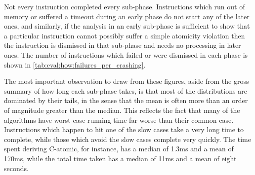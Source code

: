 Not every instruction completed every sub-phase.  Instructions which
run out of memory or suffered a timeout during an early phase do not
start any of the later ones, and similarly, if the analysis in an
early sub-phase is sufficient to show that a particular instruction
cannot possibly suffer a \gls{simple atomicity violation} then the
instruction is dismissed in that sub-phase and needs no processing in
later ones.  The number of instructions which failed or were dismissed
in each phase is shown in
\autoref{tab:eval:how:failures_per_crashing}.

The most important observation to draw from these figures, aside from
the gross summary of how long each sub-phase takes, is that most of
the distributions are dominated by their tails, in the sense that the
mean is often more than an order of magnitude greater than the median.
This reflects the fact that many of the algorithms have worst-case
running time far worse than their common case.  Instructions which
happen to hit one of the slow cases take a very long time to complete,
while those which avoid the slow cases complete very quickly.  The
time spent deriving C-atomic, for instance, has a median of 1.3ms and
a mean of 170ms, while the total time taken has a median of 11ms and a
mean of eight seconds.

